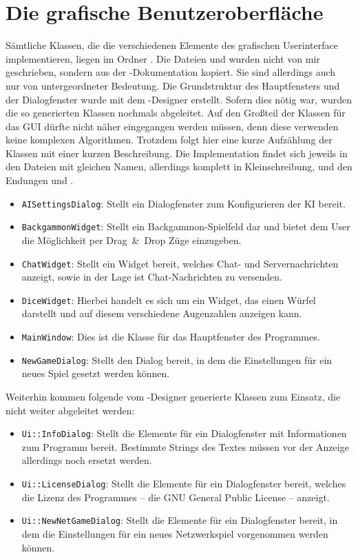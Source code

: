 \chapter{Die grafische Benutzeroberfläche}
Sämtliche Klassen, die die verschiedenen Elemente des grafischen Userinterface implementieren, liegen im Ordner . Die Dateien  und  wurden nicht von mir geschrieben, sondern aus der -Dokumentation kopiert. Sie sind allerdings auch nur von untergeordneter Bedeutung. Die Grundstruktur des Hauptfensters und der Dialogfenster wurde mit dem -Designer erstellt. Sofern dies nötig war, wurden die so generierten Klassen nochmals abgeleitet. Auf den Großteil der Klassen für das GUI dürfte nicht näher eingegangen werden müssen, denn diese verwenden keine komplexen Algorithmen. Trotzdem folgt hier eine kurze Aufzählung der Klassen mit einer kurzen Beschreibung. Die Implementation findet sich jeweils in den Dateien mit gleichen Namen, allerdings komplett in Kleinschreibung, und den Endungen  und .
\begin{itemize}
  \item \lstinline$AISettingsDialog$: Stellt ein Dialogfenster zum Konfigurieren der KI bereit.
  \item \lstinline$BackgammonWidget$: Stellt ein Backgammon-Spielfeld dar und bietet dem User die Möglichkeit per Drag~\&~Drop Züge einzugeben.
  \item \lstinline$ChatWidget$: Stellt ein Widget bereit, welches Chat- und Servernachrichten anzeigt, sowie in der Lage ist Chat-Nachrichten zu versenden.
  \item \lstinline$DiceWidget$: Hierbei handelt es sich um ein Widget, das einen Würfel darstellt und auf diesem verschiedene Augenzahlen anzeigen kann.
  \item \lstinline$MainWindow$: Dies ist die Klasse für das Hauptfenster des Programmes.
  \item \lstinline$NewGameDialog$: Stellt den Dialog bereit, in dem die Einstellungen für ein neues Spiel gesetzt werden können.
\end{itemize}
Weiterhin kommen folgende vom -Designer generierte Klassen zum Einsatz, die nicht weiter abgeleitet werden:
\begin{itemize}
  \item \lstinline$Ui::InfoDialog$: Stellt die Elemente für ein Dialogfenster mit Informationen zum Programm bereit. Bestimmte Strings des Textes müssen vor der Anzeige allerdings noch ersetzt werden.
  \item \lstinline$Ui::LicenseDialog$: Stellt die Elemente für ein Dialogfenster bereit, welches die Lizenz des Programmes -- die GNU General Public License -- anzeigt.
  \item \lstinline$Ui::NewNetGameDialog$: Stellt die Elemente für ein Dialogfenster bereit, in dem die Einstellungen für ein neues Netzwerkspiel vorgenommen werden können.
\end{itemize}


